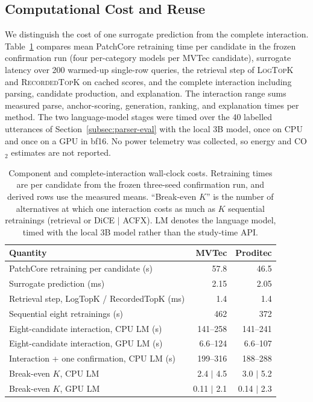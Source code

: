 \documentclass[final,5p,times,twocolumn]{elsarticle}
\begin{document}
\subsection{Computational Cost and Reuse}
\label{subsec:compute-cost}

We distinguish the cost of one surrogate prediction from the complete
interaction. Table~\ref{tab:compute-cost} compares mean PatchCore
retraining time per candidate in the frozen confirmation run (four
per-category models per MVTec candidate), surrogate latency over 200
warmed-up single-row queries, the retrieval step of \textsc{LogTopK}
and \textsc{RecordedTopK} on cached scores, and the complete
interaction including parsing, candidate production, and explanation.
The interaction range sums measured parse, anchor-scoring, generation,
ranking, and explanation times per method. The two language-model stages were timed over the 40 labelled utterances of
Section~\ref{subsec:parser-eval} with the local 3B model, once on CPU and once on a GPU in bf16. No
power telemetry was collected, so energy and CO$_2$ estimates are not
reported.

\begin{table}[!t]
\centering
\footnotesize
\caption{Component and complete-interaction wall-clock costs.
Retraining times are per candidate from the frozen three-seed confirmation run, and derived rows use the measured means. ``Break-even
$K$'' is the number of alternatives at which one interaction costs as
much as $K$ sequential retrainings (retrieval or DiCE $\mid$ ACFX). LM denotes the language model, timed with the local 3B model rather than the study-time API.}
\label{tab:compute-cost}
\setlength{\tabcolsep}{2pt}
\begin{tabular}{@{}p{}rr@{}}
\toprule
Quantity & MVTec & Proditec \\
\midrule
PatchCore retraining per candidate (s)         & 57.8  & 46.5 \\
Surrogate prediction (ms)                      & 2.15  & 2.05 \\
Retrieval step, LogTopK / RecordedTopK (ms)    & 1.4   & 1.4 \\
Sequential eight retrainings (s)               & 462   & 372 \\
Eight-candidate interaction, CPU LM (s)        & 141--258 & 141--241 \\
Eight-candidate interaction, GPU LM (s)        & 6.6--124 & 6.6--107 \\
Interaction + one confirmation, CPU LM (s)     & 199--316 & 188--288 \\
Break-even $K$, CPU LM                         & 2.4 $\mid$ 4.5 & 3.0 $\mid$ 5.2 \\
Break-even $K$, GPU LM                         & 0.11 $\mid$ 2.1 & 0.14 $\mid$ 2.3 \\
\bottomrule
\end{tabular}
\end{table}
\end{document}
